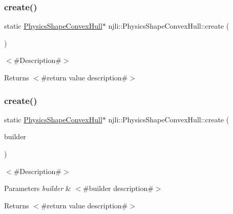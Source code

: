 \subsubsection{\texorpdfstring{create()}{create()}\hspace{0.1cm}{\footnotesize\ttfamily [1/2]}}
{\footnotesize\ttfamily static \mbox{\hyperlink{classnjli_1_1_physics_shape_convex_hull}{Physics\+Shape\+Convex\+Hull}}$\ast$ njli\+::\+Physics\+Shape\+Convex\+Hull\+::create (\begin{DoxyParamCaption}{ }\end{DoxyParamCaption})\hspace{0.3cm}{\ttfamily [static]}}

$<$\#\+Description\#$>$

\begin{DoxyReturn}{Returns}
$<$\#return value description\#$>$ 
\end{DoxyReturn}
\mbox{\label{classnjli_1_1_physics_shape_convex_hull_a022a78779d029e127635a9e8ec790ae2}} 
\subsubsection{\texorpdfstring{create()}{create()}\hspace{0.1cm}{\footnotesize\ttfamily [2/2]}}
{\footnotesize\ttfamily static \mbox{\hyperlink{classnjli_1_1_physics_shape_convex_hull}{Physics\+Shape\+Convex\+Hull}}$\ast$ njli\+::\+Physics\+Shape\+Convex\+Hull\+::create (\begin{DoxyParamCaption}\item[{const \mbox{\hyperlink{classnjli_1_1_physics_shape_convex_hull_builder}{Physics\+Shape\+Convex\+Hull\+Builder}} \&}]{builder }\end{DoxyParamCaption})\hspace{0.3cm}{\ttfamily [static]}}

$<$\#\+Description\#$>$


\begin{DoxyParams}{Parameters}
{\em builder} & $<$\#builder description\#$>$\\
\hline
\end{DoxyParams}
\begin{DoxyReturn}{Returns}
$<$\#return value description\#$>$ 
\end{DoxyReturn}
\mbox{\label{classnjli_1_1_physics_shape_convex_hull_a403439147d1030a6cbd6b8d273b19994}} 
